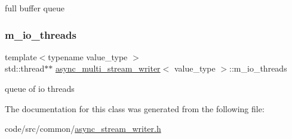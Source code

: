 full buffer queue 

\mbox{\label{classasync__multi__stream__writer_a6d7911a0a48ba0fe496b971cdb85369f}} 
\subsubsection{\texorpdfstring{m\+\_\+io\+\_\+threads}{m\_io\_threads}}
{\footnotesize\ttfamily template$<$typename value\+\_\+type $>$ \\
std\+::thread$\ast$$\ast$ \hyperlink{classasync__multi__stream__writer}{async\+\_\+multi\+\_\+stream\+\_\+writer}$<$ value\+\_\+type $>$\+::m\+\_\+io\+\_\+threads\hspace{0.3cm}{\ttfamily [private]}}



queue of io threads 



The documentation for this class was generated from the following file\+:\begin{DoxyCompactItemize}
\item 
code/src/common/\hyperlink{async__stream__writer_8h}{async\+\_\+stream\+\_\+writer.\+h}\end{DoxyCompactItemize}
